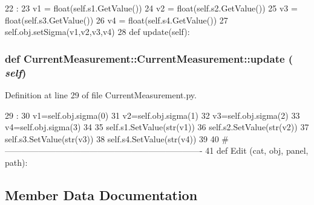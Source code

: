 \begin{DoxyCode}
22                             :
23         v1 = float(self.s1.GetValue())
24         v2 = float(self.s2.GetValue())
25         v3 = float(self.s3.GetValue())
26         v4 = float(self.s4.GetValue())
27         self.obj.setSigma(v1,v2,v3,v4)
28 
    def update(self):
\end{DoxyCode}
\hypertarget{classCurrentMeasurement_1_1CurrentMeasurement_a982772cd38be997fa14bec525e04ca11}{
\subsubsection[{update}]{\setlength{\rightskip}{0pt plus 5cm}def CurrentMeasurement::CurrentMeasurement::update ( {\em self})}}
\label{classCurrentMeasurement_1_1CurrentMeasurement_a982772cd38be997fa14bec525e04ca11}


Definition at line 29 of file CurrentMeasurement.py.


\begin{DoxyCode}
29                     :
30         v1=self.obj.sigma(0)
31         v2=self.obj.sigma(1)
32         v3=self.obj.sigma(2)
33         v4=self.obj.sigma(3)
34 
35         self.s1.SetValue(str(v1))
36         self.s2.SetValue(str(v2))
37         self.s3.SetValue(str(v3))
38         self.s4.SetValue(str(v4))        
39 
40 #----------------------------------------------------------------------
41 
def Edit (cat, obj, panel, path):
\end{DoxyCode}


\subsection{Member Data Documentation}
\hypertarget{classCurrentMeasurement_1_1CurrentMeasurement_a42bc14191333b5834010b05d2ca3ece6}{
\subsubsection[{s1}]{}}
\label{classCurrentMeasurement_1_1CurrentMeasurement_a42bc14191333b5834010b05d2ca3ece6}


